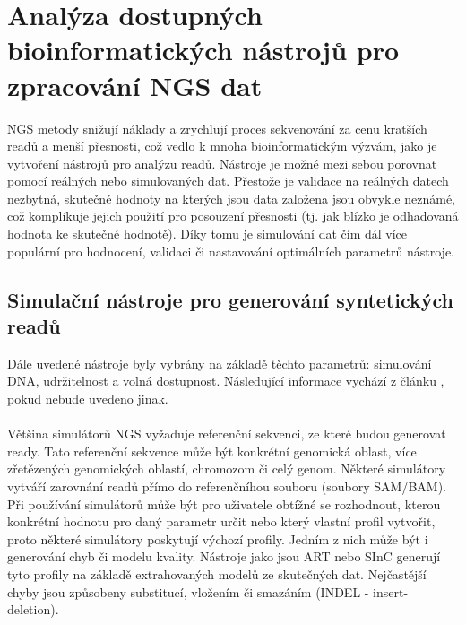 \documentclass[czech,DP]{thesiskiv}
\numberwithin{equation}{section}
\begin{document}
\chapter{Analýza dostupných bioinformatických nástrojů pro zpracování NGS dat}
NGS metody snižují náklady a zrychlují proces sekvenování za cenu kratších readů a menší přesnosti, což vedlo k mnoha bioinformatickým výzvám, jako je vytvoření nástrojů pro analýzu readů. Nástroje je možné mezi sebou porovnat pomocí reálných nebo simulovaných dat. Přestože je validace na reálných datech nezbytná, skutečné hodnoty na kterých jsou data založena jsou obvykle neznámé, což komplikuje jejich použití pro posouzení přesnosti (tj. jak blízko je odhadovaná hodnota ke skutečné hodnotě). Díky tomu je simulování dat čím dál více populární pro hodnocení, validaci či nastavování optimálních parametrů nástroje. \cite{simulation_read}


\section{Simulační nástroje pro generování syntetických readů}
Dále uvedené nástroje byly vybrány na základě těchto parametrů: simulování DNA, udržitelnost a volná dostupnost. Následující informace vychází z článku \cite{simulation_read}, pokud nebude uvedeno jinak.
\\
\\
Většina simulátorů NGS vyžaduje referenční sekvenci, ze které budou generovat ready. Tato referenční sekvence může být konkrétní genomická oblast, více zřetězených genomických oblastí, chromozom či celý genom. Některé simulátory vytváří zarovnání readů přímo do referenčníhou souboru (soubory SAM/BAM). Při používání simulátorů může být pro uživatele obtížné se rozhodnout, kterou konkrétní hodnotu pro daný parametr určit nebo který vlastní profil vytvořit, proto některé simulátory poskytují výchozí profily. Jedním z nich může být i generování chyb či modelu kvality. Nástroje jako jsou ART nebo SInC generují tyto profily na základě extrahovaných modelů ze skutečných dat. Nejčastější chyby jsou způsobeny substitucí, vložením či smazáním (INDEL - insert-deletion).
\end{document}
